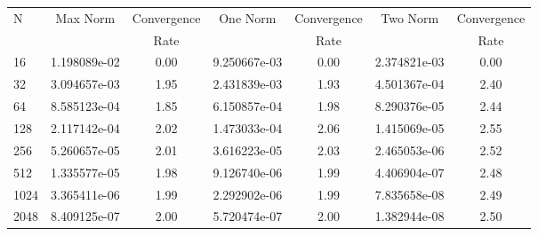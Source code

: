 \documentclass[12pt]{article}
\begin{document}
	\begin{tabular}{l|c|c|c|c|c|c}
		N&Max Norm&Convergence&One Norm&Convergence&Two Norm&Convergence\\
		&&Rate&&Rate&&Rate\\
		\hline
		16&1.198089e-02&0.00&9.250667e-03&0.00&2.374821e-03&0.00\\
		\hline
		32&3.094657e-03&1.95&2.431839e-03&1.93&4.501367e-04&2.40\\
		\hline
		64&8.585123e-04&1.85&6.150857e-04&1.98&8.290376e-05&2.44\\
		\hline
		128&2.117142e-04&2.02&1.473033e-04&2.06&1.415069e-05&2.55\\
		\hline
		256&5.260657e-05&2.01&3.616223e-05&2.03&2.465053e-06&2.52\\
		\hline
		512&1.335577e-05&1.98&9.126740e-06&1.99&4.406904e-07&2.48\\
		\hline
		1024&3.365411e-06&1.99&2.292902e-06&1.99&7.835658e-08&2.49\\
		\hline
		2048&8.409125e-07&2.00&5.720474e-07&2.00&1.382944e-08&2.50\\
	\end{tabular}
\end{document}
